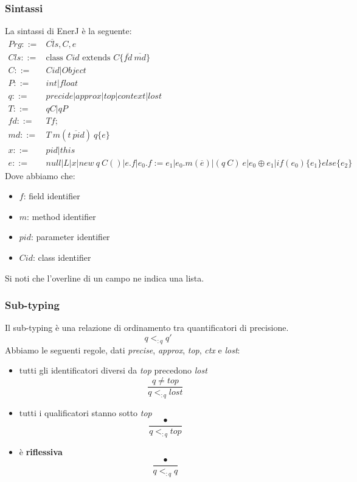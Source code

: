 \subsubsection{Sintassi}
La sintassi di EnerJ è la seguente:
\begin{align*}
	Prg ::= &\overline{Cls}, C, e \\
	Cls ::= &\text{class }Cid\text{ extends }C \{\overline{fd} \: \overline{md}\}\\
	C ::= & Cid \vert Object \\
	P ::= &int \vert float \\
	q ::= &precide \vert approx \vert top \vert context \vert lost \\
	T ::= & q C \vert q P \\
	fd ::= &T f;\\
	md ::= &T \: m(\overline{t \: pid}) \: q \{e\}\\
	x ::= & pid \vert this \\
	e ::= & null \vert L \vert x \vert new \: q \: C()\vert e.f \vert e_0.f:=e_1 \vert e_0.m(\overline{e}) \vert (q \: C) \: e \vert e_0 \oplus e_1 \vert if(e_0)\{e_1\} else \{e_2\}
\end{align*}
Dove abbiamo che:
\begin{itemize}
	\item $f$: field identifier
	\item $m$: method identifier
	\item $pid$: parameter identifier
	\item $Cid$: class identifier
\end{itemize}
\begin{note}
	Si noti che l'overline di un campo ne indica una lista.
\end{note}

\subsubsection{Sub-typing}
Il sub-typing è una relazione di ordinamento tra quantificatori di precisione.
\begin{equation}
	q <_{:q} q'
\end{equation}
Abbiamo le seguenti regole, dati \textit{precise}, \textit{approx}, \textit{top}, \textit{ctx} e \textit{lost}:
\begin{itemize}
	\item tutti gli identificatori diversi da \textit{top} precedono \textit{lost}
	\begin{equation}
		\frac{q \neq top}{q <_{:q} lost}
	\end{equation}
	\item tutti i qualificatori stanno sotto \textit{top}
	\begin{equation}
		\frac{\bullet}{q <_{:q}top}
	\end{equation}
	\item è \textbf{riflessiva}
	\begin{equation}
		\frac{\bullet}{q <_{:q}q}
	\end{equation}
\end{itemize} 
